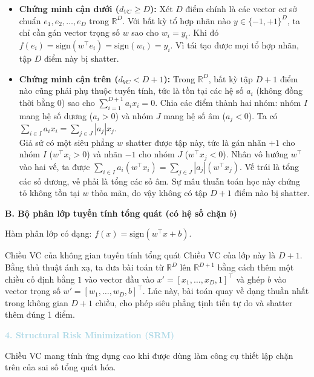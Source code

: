 \begin{itemize}
    \item \textbf{Chứng minh cận dưới ($d_{VC} \ge D$):} Xét $D$ điểm chính là các vector cơ sở chuẩn $e_1, e_2, \dots, e_D$ trong $\mathbb{R}^D$. Với bất kỳ tổ hợp nhãn nào $y \in \{-1, +1\}^D$, ta chỉ cần gán vector trọng số $w$ sao cho $w_i = y_i$. Khi đó $f(e_i) = \text{sign}(w^\top e_i) = \text{sign}(w_i) = y_i$. Vì tái tạo được mọi tổ hợp nhãn, tập $D$ điểm này bị shatter.
    \item \textbf{Chứng minh cận trên ($d_{VC} < D + 1$):} Trong $\mathbb{R}^D$, bất kỳ tập $D+1$ điểm nào cũng phải phụ thuộc tuyến tính, tức là tồn tại các hệ số $a_i$ (không đồng thời bằng $0$) sao cho $\sum_{i=1}^{D+1} a_i x_i = 0$. Chia các điểm thành hai nhóm: nhóm $I$ mang hệ số dương ($a_i > 0$) và nhóm $J$ mang hệ số âm ($a_j < 0$). Ta có $\sum_{i \in I} a_i x_i = \sum_{j \in J} |a_j| x_j$. \\
    Giả sử có một siêu phẳng $w$ shatter được tập này, tức là gán nhãn $+1$ cho nhóm $I$ ($w^\top x_i > 0$) và nhãn $-1$ cho nhóm $J$ ($w^\top x_j < 0$). Nhân vô hướng $w^\top$ vào hai vế, ta được $\sum_{i \in I} a_i (w^\top x_i) = \sum_{j \in J} |a_j| (w^\top x_j)$. Vế trái là tổng các số dương, vế phải là tổng các số âm. Sự mâu thuẫn toán học này chứng tỏ không tồn tại $w$ thỏa mãn, do vậy không có tập $D+1$ điểm nào bị shatter.
\end{itemize}

\textbf{B. Bộ phân lớp tuyến tính tổng quát (có hệ số chặn $b$)}

Hàm phân lớp có dạng: $f(x) = \text{sign}(w^\top x + b)$.

\begin{notebox}{Chiều VC của không gian tuyến tính tổng quát}
Chiều VC của lớp này là $D + 1$. Bằng thủ thuật ánh xạ, ta đưa bài toán từ $\mathbb{R}^D$ lên $\mathbb{R}^{D+1}$ bằng cách thêm một chiều cố định bằng $1$ vào vector đầu vào $x' = [x_1, \dots, x_D, 1]^\top$ và ghép $b$ vào vector trọng số $w' = [w_1, \dots, w_D, b]^\top$. Lúc này, bài toán quay về dạng thuần nhất trong không gian $D+1$ chiều, cho phép siêu phẳng tịnh tiến tự do và shatter thêm đúng 1 điểm.
\end{notebox}

\vspace{0.5em}
\noindent\textcolor{lightblue}{\textbf{4. Structural Risk Minimization (SRM)}}
\vspace{0.5em}

Chiều VC mang tính ứng dụng cao khi được dùng làm công cụ thiết lập chặn trên của sai số tổng quát hóa.


